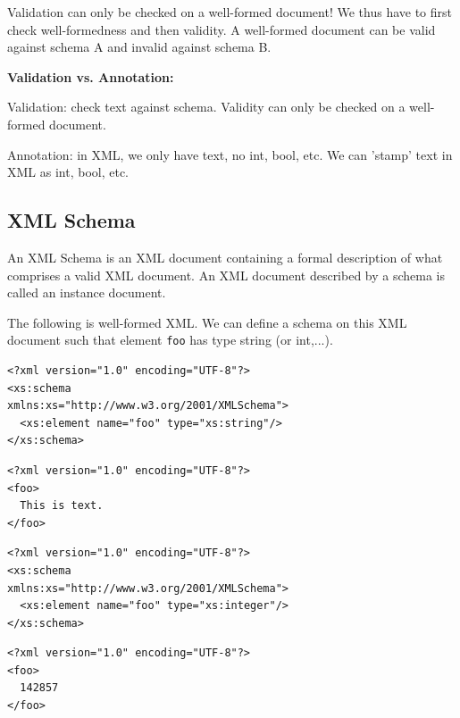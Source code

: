 \documentclass[11pt,oneside,a4paper]{article}
\begin{document}
Validation can only be checked on a well-formed document! We thus have to first check well-formedness and then validity. A well-formed document can be valid against schema A and invalid against schema B.

\textbf{Validation vs. Annotation:}

\begin{compactitem}
	\item Validation: check text against schema. Validity can only be checked on a well-formed document.
	\item Annotation: in XML, we only have text, no int, bool, etc. We can 'stamp' text in XML as int, bool, etc.	
\end{compactitem}


\subsection{XML Schema}

An XML Schema is an XML document containing a formal description of what comprises a valid XML document. An XML document described by a schema is called an instance document.

The following is well-formed XML. We can define a schema on this XML document such that element \verb|foo| has type string (or int,...).

\begin{multicols}{2}
\lstset{language=XML}
\begin{lstlisting}
<?xml version="1.0" encoding="UTF-8"?>
<xs:schema
xmlns:xs="http://www.w3.org/2001/XMLSchema">
  <xs:element name="foo" type="xs:string"/>
</xs:schema>
\end{lstlisting}
	
\lstset{language=XML}
\begin{lstlisting}
<?xml version="1.0" encoding="UTF-8"?>
<foo>
  This is text.
</foo>
\end{lstlisting}
\end{multicols}

\begin{multicols}{2}
\lstset{language=XML}
\begin{lstlisting}
<?xml version="1.0" encoding="UTF-8"?>
<xs:schema
xmlns:xs="http://www.w3.org/2001/XMLSchema">
  <xs:element name="foo" type="xs:integer"/>
</xs:schema>
\end{lstlisting}
	
\lstset{language=XML}
\begin{lstlisting}
<?xml version="1.0" encoding="UTF-8"?>
<foo>
  142857
</foo>
\end{lstlisting}
\end{multicols}
\end{document}
